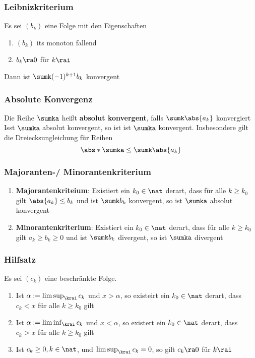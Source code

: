 \documentclass{kit}
\begin{document}
    \subsubsection{Leibnizkriterium}
      Es sei $(b_k)$ eine Folge mit den Eigenschaften
      \begin{enumerate}
        \item $(b_k)$ its monoton fallend
        \item $b_k\ra0$ für $k\rai$
      \end{enumerate}
      Dann ist $\sumk(-1)^{k+1}b_k$ konvergent
    \subsubsection{Absolute Konvergenz}
      Die Reihe $\sumka$ heißt \textbf{absolut konvergent}, falls $\sumk\abs{a_k}$ konvergiert\\
      Isst $\sumka$ absolut konvergent, so ist ist $\sumka$ konvergent. Insbesondere gilt die Dreiecksungleichung für Reihen
      $$\abs*{\sumka}\le\sumk\abs{a_k}$$
    \subsubsection{Majoranten-/ Minorantenkriterium}
      \begin{enumerate}
        \item \textbf{Majorantenkriteium}: Existiert ein $k_0\in\nat$ derart, dass für alle $k\ge k_0$ gilt $\abs{a_k}\le b_k$ und ist $\sumk b_k$ konvergent, so ist $\sumka$ absolut konvergent
        \item \textbf{Minorantenkriterium}: Existiert ein $k_0\in\nat$ derart, dass für alle $k\ge k_0$ gilt $a_k\ge b_k\ge 0$ und ist $\sumk b_k$ divergent, so ist $\sumka$ divergent
      \end{enumerate}
    \subsubsection{Hilfsatz}
      Es sei $(c_k)$ eine beschränkte Folge.
      \begin{enumerate}
        \item Ist $\alpha:=\limsup_\krai c_k$ und $x>\alpha$, so existeirt ein $k_0\in\nat$ derart, dass $c_k<x$ für alle $k\ge k_0$ gilt
        \item Ist $\alpha:=\liminf_\krai c_k$ und $x<\alpha$, so existert ein $k_0\in\nat$ derart, dass $c_k>x$ für alle $k\ge k_0$ gilt
        \item Ist $c_k\ge0,k\in\nat$, und $\limsup_\krai c_k=0$, so gilt $c_k\ra0$ für $k\rai$
      \end{enumerate}
\end{document}
